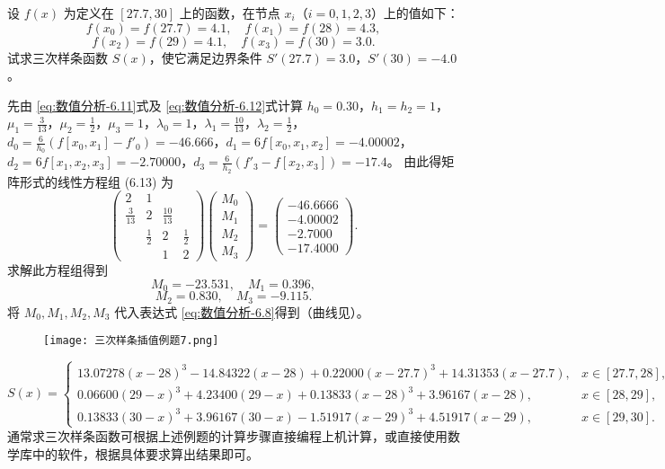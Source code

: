\documentclass[../../main.tex]{subfiles}
\begin{document}
\begin{example}
设 $f(x)$ 为定义在 $[27.7,30]$ 上的函数，在节点 $x_i$（$i=0,1,2,3$）上的值如下：
$$f(x_0)=f(27.7)=4.1, \quad f(x_1)=f(28)=4.3,$$
$$f(x_2)=f(29)=4.1, \quad f(x_3)=f(30)=3.0.$$
试求三次样条函数 $S(x)$，使它满足边界条件 $S'(27.7)=3.0$，$S'(30)=-4.0$。
\end{example}
\begin{solution}
先由 \eqref{eq:数值分析-6.11}式及 \eqref{eq:数值分析-6.12}式计算 $h_0=0.30$，$h_1=h_2=1$，$\mu_1=\frac{3}{13}$，$\mu_2=\frac{1}{2}$，$\mu_3=1$，$\lambda_0=1$，$\lambda_1=\frac{10}{13}$，$\lambda_2=\frac{1}{2}$，$d_0=\frac{6}{h_0}(f[x_0,x_1]-f'_0)=-46.666$，$d_1=6f[x_0,x_1,x_2]=-4.00002$，$d_2=6f[x_1,x_2,x_3]=-2.70000$，$d_3=\frac{6}{h_2}(f'_3-f[x_2,x_3])=-17.4$。
由此得矩阵形式的线性方程组 (6.13) 为
$$\begin{pmatrix}
2 & 1 & & \\
\frac{3}{13} & 2 & \frac{10}{13} & \\
& \frac{1}{2} & 2 & \frac{1}{2} \\
& & 1 & 2
\end{pmatrix}
\begin{pmatrix}
M_0 \\
M_1 \\
M_2 \\
M_3
\end{pmatrix}
=
\begin{pmatrix}
-46.6666 \\
-4.00002 \\
-2.7000 \\
-17.4000
\end{pmatrix}.$$
求解此方程组得到
$$M_0=-23.531, \quad M_1=0.396,$$
$$M_2=0.830, \quad M_3=-9.115.$$
将 $M_0,M_1,M_2,M_3$ 代入表达式 \eqref{eq:数值分析-6.8}得到（曲线见）。
\begin{figure}[H]
\centering
\texttt{[image: 三次样条插值例题7.png]}
\caption{}
\label{figure:三次样条插值例题7}
\end{figure}
$$
S(x)=
\begin{cases}
13.07278(x-28)^3 - 14.84322(x-28) + 0.22000(x-27.7)^3 + 14.31353(x-27.7), & x \in [27.7,28], \\
0.06600(29-x)^3 + 4.23400(29-x) + 0.13833(x-28)^3 + 3.96167(x-28), & x \in [28,29], \\
0.13833(30-x)^3 + 3.96167(30-x) - 1.51917(x-29)^3 + 4.51917(x-29), & x \in [29,30].
\end{cases}
$$
通常求三次样条函数可根据上述例题的计算步骤直接编程上机计算，或直接使用数学库中的软件，根据具体要求算出结果即可。
\end{solution}
\end{document}
